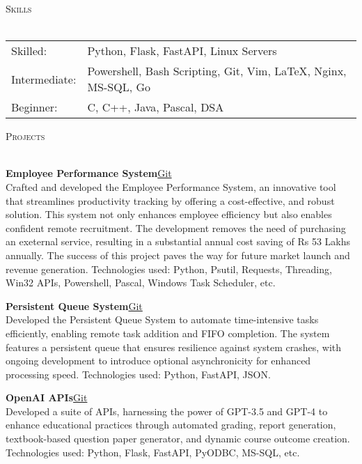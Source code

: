 \documentclass[a4paper]{article}
\newcommand{\lineunder} {
\vspace*{-8pt} \\
\hspace*{-18pt} \hrulefill \\
}
\newcommand{\header} [1] {
{\hspace*{-18pt}\vspace*{6pt} \textsc{#1}}
\vspace*{-6pt} \lineunder
}
\begin{document}

\header{Skills}
\vspace{1mm}

\begin{tabular}{V{5cm} @{\hskip 0.6cm} V{12cm}}
Skilled: & Python, Flask, FastAPI, Linux Servers \\
Intermediate: & Powershell, Bash Scripting, Git, Vim, \LaTeX, Nginx, MS-SQL, Go \\
Beginner: & C, C++, Java, Pascal, DSA \\
\end{tabular}

\vspace{4mm}


\header{Projects}
\vspace{1mm}

{\textbf{Employee Performance System}}\hfill \href{https://github.com/swarnimcodes/employee-performance}{Git}\\
Crafted and developed the Employee Performance System, an innovative tool that 
streamlines productivity tracking by offering a cost-effective, and robust solution. 
This system not only enhances employee efficiency but also enables confident 
remote recruitment. The development removes the need of purchasing an 
exeternal service, resulting in a substantial annual cost saving of Rs 53 Lakhs annually. 
The success of this project paves the way for future market launch and revenue generation. 
Technologies used: Python, Psutil, Requests, Threading, Win32 APIs, Powershell, Pascal, Windows Task Scheduler, etc.\\
\vspace*{2mm}

{\textbf{Persistent Queue System}}\hfill \href{https://github.com/swarnimcodes/kafkaesqueue}{Git}\\
Developed the Persistent Queue System to automate time-intensive tasks efficiently, 
enabling remote task addition and FIFO completion. The system features a persistent 
queue that ensures resilience against system crashes, with ongoing development to 
introduce optional asynchronicity for enhanced processing speed. 
Technologies used: Python, FastAPI, JSON.\\
\vspace*{2mm}

{\textbf{OpenAI APIs}}\hfill \href{https://github.com/swarnimcodes/openai-gen-co-and-qp}{Git}\\
Developed a suite of APIs, harnessing the power of GPT-3.5 and GPT-4 to enhance educational practices 
through automated grading, report generation, textbook-based question paper generator, and 
dynamic course outcome creation. 
Technologies used: Python, Flask, FastAPI, PyODBC, MS-SQL, etc.\\
\vspace*{2mm}
\end{document}
